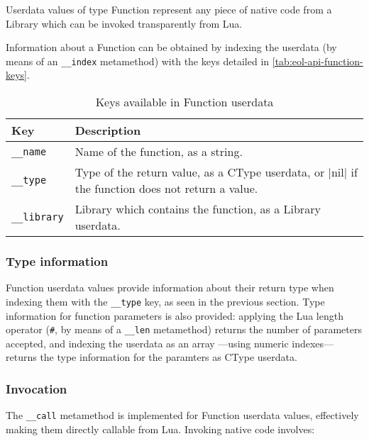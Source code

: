 Userdata values of type \textsf{Function} represent any piece of native code
from a \textsf{Library} which can be invoked transparently from Lua.

Information about a \textsf{Function} can be obtained by indexing the userdata
(by means of an \texttt{\_\_index} metamethod) with the keys detailed in
\autoref{tab:eol-api-function-keys}.

\begin{table}[ht]
	\centering
	\begin{tabular}{lp{}}
		\toprule
		Key & Description \\
		\midrule
		\texttt{\_\_name} & Name of the function, as a string. \\
		\texttt{\_\_type} & Type of the return value, as a \textsf{CType}
			userdata, or \Mlua|nil| if the function does not return a value. \\
		\texttt{\_\_library} & Library which contains the function, as a
			\textsf{Library} userdata. \\
		\bottomrule
	\end{tabular}
	\caption{Keys available in \textsf{Function} userdata}
	\label{tab:eol-api-function-keys}
\end{table}


\subsubsection{Type information}

\textsf{Function} userdata values provide information about their return type
when indexing them with the \texttt{\_\_type} key, as seen in the previous
section. Type information for function parameters is also provided: applying
the Lua length operator (\texttt\#, by means of a \texttt{\_\_len} metamethod)
returns the number of parameters accepted, and indexing the userdata as an
array —using numeric indexes— returns the type information for the paramters
as \textsf{CType} userdata.


\subsubsection{Invocation}

The \texttt{\_\_call} metamethod is implemented for \textsf{Function}
userdata values, effectively making them directly callable from Lua. Invoking
native code involves:

